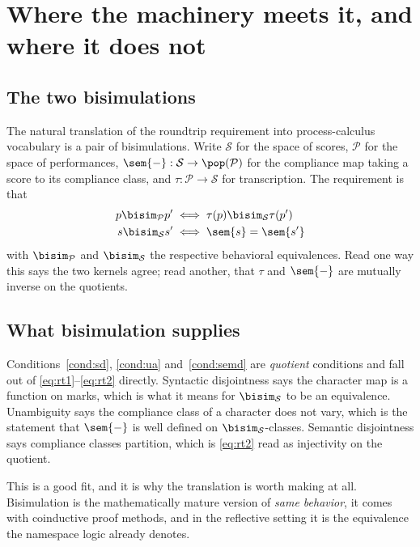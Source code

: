 \section{Where the machinery meets it, and where it does not}
\label{sec:bisim}

\subsection{The two bisimulations}

The natural translation of the roundtrip requirement into
process-calculus vocabulary is a pair of bisimulations.
Write $\mathcal{S}$ for the space of scores, $\mathcal{P}$ for the
space of performances, $\sem{-} : \mathcal{S} \to
\pop(\mathcal{P})$ for the compliance map taking a score to its
compliance class, and $\tau : \mathcal{P} \to \mathcal{S}$ for
transcription.
The requirement is that
\begin{align}
p \bisim_{\mathcal{P}} p' &\iff \tau(p) \bisim_{\mathcal{S}} \tau(p') \label{eq:rt1}\\
s \bisim_{\mathcal{S}} s' &\iff \sem{s} = \sem{s'} \label{eq:rt2}
\end{align}
with $\bisim_{\mathcal{P}}$ and $\bisim_{\mathcal{S}}$ the
respective behavioral equivalences.
Read one way this says the two kernels agree; read another, that
$\tau$ and $\sem{-}$ are mutually inverse on the quotients.

\subsection{What bisimulation supplies}

Conditions~\ref{cond:sd}, \ref{cond:ua} and~\ref{cond:semd} are
\emph{quotient} conditions and fall out of
\eqref{eq:rt1}--\eqref{eq:rt2} directly.
Syntactic disjointness says the character map is a function on
marks, which is what it means for $\bisim_{\mathcal{S}}$ to be an
equivalence.
Unambiguity says the compliance class of a character does not vary,
which is the statement that $\sem{-}$ is well defined on
$\bisim_{\mathcal{S}}$-classes.
Semantic disjointness says compliance classes partition, which is
\eqref{eq:rt2} read as injectivity on the quotient.

This is a good fit, and it is why the translation is worth making
at all.
Bisimulation is the mathematically mature version of \emph{same
behavior}, it comes with coinductive proof methods, and in the
reflective setting it is the equivalence the namespace logic
already denotes.

